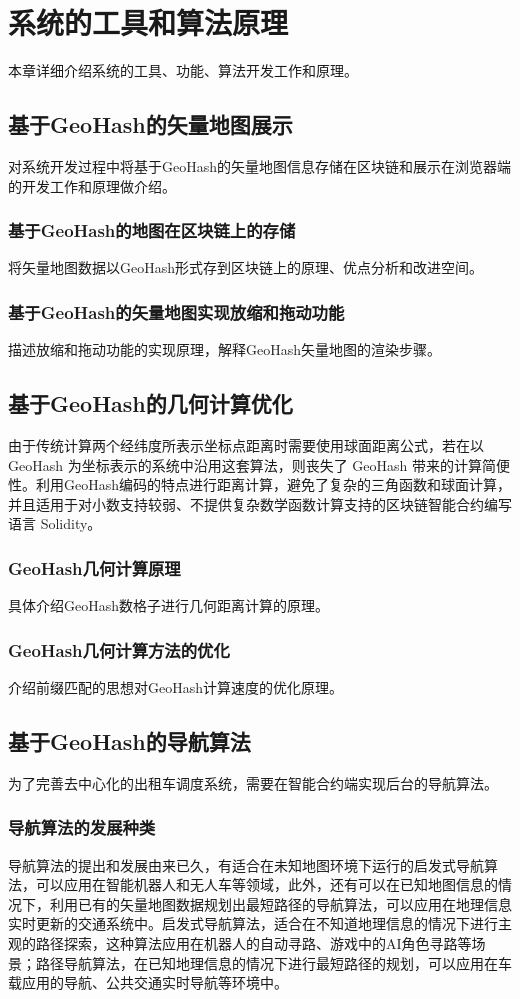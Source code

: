 \chapter{系统的工具和算法原理}
本章详细介绍系统的工具、功能、算法开发工作和原理。

\section{基于GeoHash的矢量地图展示}
对系统开发过程中将基于GeoHash的矢量地图信息存储在区块链和展示在浏览器端的开发工作和原理做介绍。
\subsection{基于GeoHash的地图在区块链上的存储}
将矢量地图数据以GeoHash形式存到区块链上的原理、优点分析和改进空间。
\subsection{基于GeoHash的矢量地图实现放缩和拖动功能}
描述放缩和拖动功能的实现原理，解释GeoHash矢量地图的渲染步骤。

\section{基于GeoHash的几何计算优化}
由于传统计算两个经纬度所表示坐标点距离时需要使用球面距离公式，若在以 GeoHash 为坐标表示的系统中沿用这套算法，则丧失了 GeoHash 带来的计算简便性。利用GeoHash编码的特点进行距离计算，避免了复杂的三角函数和球面计算，并且适用于对小数支持较弱、不提供复杂数学函数计算支持的区块链智能合约编写语言 Solidity。
\subsection{GeoHash几何计算原理}
具体介绍GeoHash数格子进行几何距离计算的原理。
\subsection{GeoHash几何计算方法的优化}
介绍前缀匹配的思想对GeoHash计算速度的优化原理。

\section{基于GeoHash的导航算法}
为了完善去中心化的出租车调度系统，需要在智能合约端实现后台的导航算法。
\subsection{导航算法的发展种类}
导航算法的提出和发展由来已久，有适合在未知地图环境下运行的启发式导航算法，可以应用在智能机器人和无人车等领域，此外，还有可以在已知地图信息的情况下，利用已有的矢量地图数据规划出最短路径的导航算法，可以应用在地理信息实时更新的交通系统中。启发式导航算法，适合在不知道地理信息的情况下进行主观的路径探索，这种算法应用在机器人的自动寻路、游戏中的AI角色寻路等场景；路径导航算法，在已知地理信息的情况下进行最短路径的规划，可以应用在车载应用的导航、公共交通实时导航等环境中。
